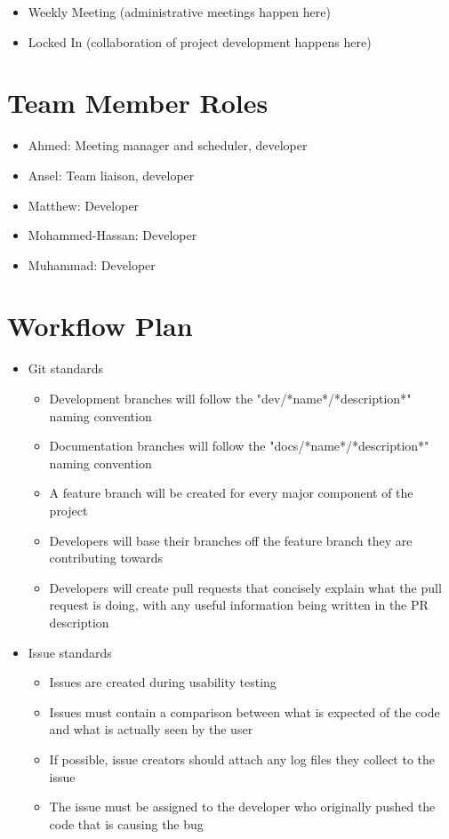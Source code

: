 \documentclass{article}
\begin{document}
\begin{itemize}
  \item Weekly Meeting (administrative meetings happen here)
  \item Locked In (collaboration of project development happens here)
\end{itemize}
\section{Team Member Roles}
\begin{itemize}
  \item Ahmed: Meeting manager and scheduler, developer
  \item Ansel: Team liaison, developer
  \item Matthew: Developer
  \item Mohammed-Hassan: Developer
  \item Muhammad: Developer
\end{itemize}

\section{Workflow Plan}

\begin{itemize}
	\item Git standards
  \begin{itemize}
    \item Development branches will follow the "dev/*name*/*description*" naming convention
    \item Documentation branches will follow the "docs/*name*/*description*" naming convention
    \item A feature branch will be created for every major component of the project
    \item Developers will base their branches off the feature branch they are contributing towards
    \item Developers will create pull requests that concisely explain what the pull request is doing,
    with any useful information being written in the PR description
  \end{itemize}
	\item Issue standards
  \begin{itemize}
    \item Issues are created during usability testing
    \item Issues must contain a comparison between what is expected of the code
    and what is actually seen by the user
    \item If possible, issue creators should attach any log files they collect to the issue
    \item The issue must be assigned to the developer who originally pushed
    the code that is causing the bug
  \end{itemize}
\end{itemize}
\end{document}
